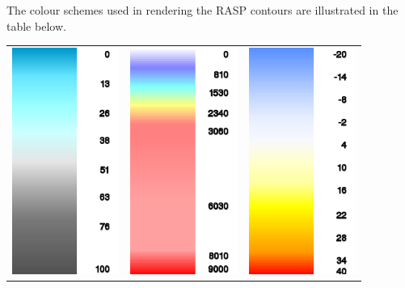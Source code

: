 \begin{maxipage}
The colour schemes used in rendering the RASP contours are illustrated
in the table below.

\begin{longtable}{c c c}
\includegraphics[angle=0,width=3.5cm,keepaspectratio='true']{figures/ramp-rasp-cloudpct.png}&

\includegraphics[angle=0,width=3.5cm,keepaspectratio='true']{figures/ramp-rasp-h.png}&

\includegraphics[angle=0,width=3.5cm,keepaspectratio='true']{figures/ramp-rasp-temperature.png}\\


\end{longtable}
\end{maxipage}
